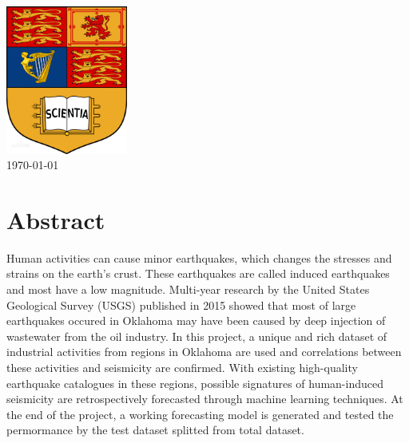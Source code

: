 \documentclass[final-report]{report-template}
\begin{document}
\begin{titlepage}

\includegraphics[width=0.3\textwidth]{school.png}\\[3cm] %
 



{\large \today}\\[1cm] %

\githubrepo  %
\vfill %

\end{titlepage}



\tableofcontents
\newpage

\section*{Abstract}
Human activities can cause minor earthquakes, which changes the stresses and strains on the earth's crust.
These earthquakes are called induced earthquakes and most have a low magnitude. 
Multi-year research by the United States Geological Survey (USGS) published in 2015 showed that most of large earthquakes occured in Oklahoma may have been caused by deep injection of wastewater from the oil industry.
In this project, a unique and rich dataset of industrial activities from regions in Oklahoma are used and correlations between these activities and seismicity are confirmed.
With existing high-quality earthquake catalogues in these regions, possible signatures of human-induced seismicity are retrospectively forecasted through machine learning techniques. 
At the end of the project, a working forecasting model is generated and tested the permormance by the test dataset splitted from total dataset.
\end{document}
